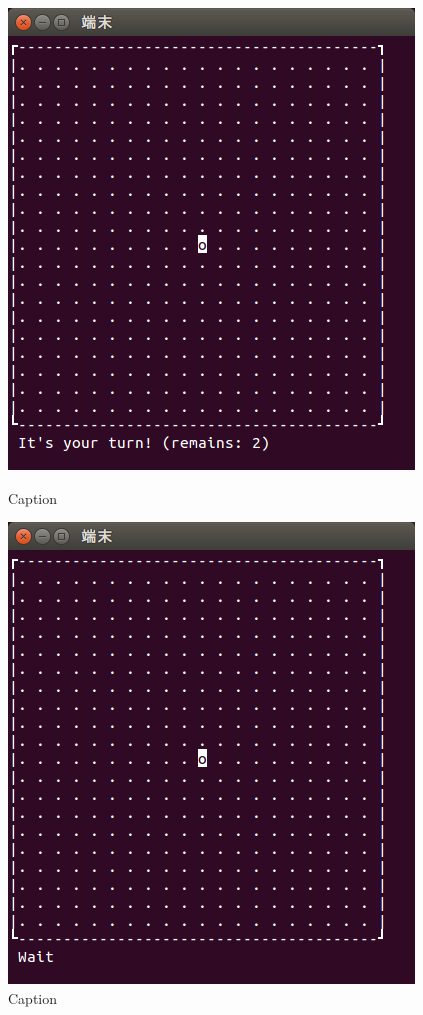 \documentclass[a4j, titlepage, 10pt]{jsarticle}
\begin{document}
\begin{figure}[H]
  \begin{minipage}{0.5\hsize}
    \centering
    \includegraphics[scale=0.5]{img/put1-1.png}
    \caption{Caption}
    \label{fig:put1-1.png}
  \end{minipage}
  \begin{minipage}{0.5\hsize}
    \includegraphics[scale=0.5]{img/put1-2.png}
    \caption{Caption}
    \label{fig:put1-2.png}
  \end{minipage}
\end{figure}
\end{document}
